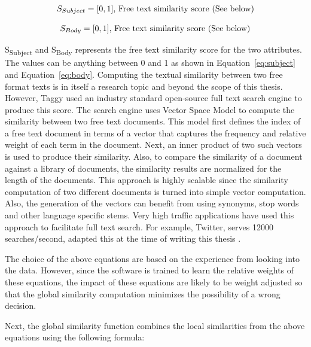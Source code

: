 \begin{equation}
\label{eq:subject}
S_{Subject} = [0, 1]\mbox{, Free text similarity score (See below)}\\
\end{equation}

\begin{equation}
\label{eq:body}
S_{Body} = [0, 1]\mbox{, Free text similarity score (See below)}\\
\end{equation}

S\textsubscript{Subject} and S\textsubscript{Body} represents the free text similarity score for the two attributes. The values can be anything between 0 and 1 as shown in Equation~\ref{eq:subject} and Equation~\ref{eq:body}. Computing the textual similarity between two free format texts is in itself a research topic and beyond the scope of this thesis. However, Taggy used an industry standard open-source full text search engine to produce this score. The search engine uses Vector Space Model \cite{a_vector_space} to compute the similarity between two free text documents. This model first defines the index of a free text document in terms of a vector that captures the frequency and relative weight of each term in the document. Next, an inner product of two such vectors is used to produce their similarity. Also, to compare the similarity of a document against a library of documents, the similarity results are normalized for the length of the documents. This approach is highly scalable since the similarity computation of two different documents is turned into simple vector computation. Also, the generation of the vectors can benefit from using synonyms, stop words and other language specific stems. Very high traffic applications have used this approach to facilitate full text search. For example, Twitter, serves 12000 searches/second, adapted this at the time of writing this thesis \cite{twitter_lucene}.

The choice of the above equations are based on the experience from looking into the data. However, since the software is trained to learn the relative weights of these equations, the impact of these equations are likely to be weight adjusted so that the global similarity computation minimizes the possibility of a wrong decision.

Next, the global similarity function combines the local similarities from the above equations using the following formula:

